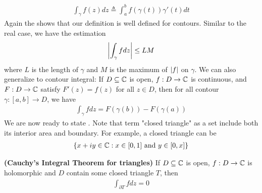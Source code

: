 \documentclass{report}
\begin{document}
\begin{mdframed}
\begin{align*}
\int_\gamma f(z)dz \triangleq \int_a^b f(\gamma  (t))\gamma  '(t)dt
\end{align*}
Again the  shows that our definition is well defined for contours. Similar to the real case, we have the estimation  
\begin{align}
\label{LM}
\left|\int_{\gamma}fdz\right|\leq LM
\end{align}
where $L$ is the length of  $\gamma $ and $M$ is the maximum of  $\left|f\right|$ on $\gamma $. We can also generalize  to contour integral: If $D\subseteq \mathbb{C}$ is open, $f:D\rightarrow \mathbb{C}$ is continuous, and $F:D\rightarrow \mathbb{C}$ satisfy $F'(z)=f(z)$ for all $z\in D$, then for all contour $\gamma :[a,b]\rightarrow D$, we have 
\begin{align*}
\int_{\gamma }fdz=F(\gamma (b))-F(\gamma (a))
\end{align*}
We are now ready to state . Note that term "closed triangle" as a set include both its interior area and boundary. For example, a closed triangle can be 
\begin{align*}
\{ x+iy \in\mathbb{C}: x\in [0,1]\text{ and }y\in [0,x] \}
\end{align*}
\end{mdframed}
\begin{theorem}
\label{CTft}
\textbf{(Cauchy's Integral Theorem for triangles)} If $D\subseteq \mathbb{C}$ is open, $f:D\rightarrow \mathbb{C}$ is holomorphic and $D$ contain some closed triangle  $T$, then 
\begin{align*}
\int_{\partial  T}fdz=0
\end{align*}
\end{theorem}
\end{document}
